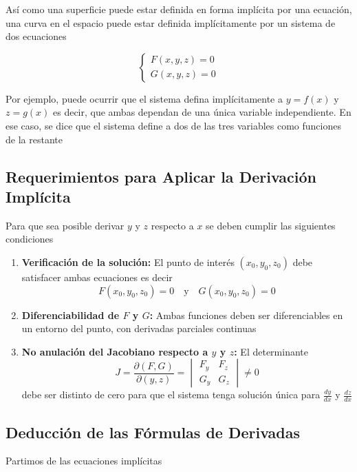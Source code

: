 \documentclass{article}
\begin{document}
Así como una superficie puede estar definida en forma implícita por una ecuación, una curva en el espacio puede estar definida implícitamente por un sistema de dos ecuaciones

\[
\begin{cases}
F(x,y,z) = 0 \\
G(x,y,z) = 0
\end{cases}
\]

Por ejemplo, puede ocurrir que el sistema defina implícitamente a \( y = f(x) \) y \( z = g(x) \) es decir, que ambas dependan de una única variable independiente. En ese caso, se dice que el sistema define a dos de las tres variables como funciones de la restante

\subsection*{Requerimientos para Aplicar la Derivación Implícita}
Para que sea posible derivar \( y \) y \( z \) respecto a \( x \) se deben cumplir las siguientes condiciones

\begin{enumerate}
    \item \textbf{\color{teal}Verificación de la solución:} El punto de interés \( (x_0, y_0, z_0) \) debe satisfacer ambas ecuaciones es decir
    \[
    F(x_0, y_0, z_0) = 0 \quad \text{y} \quad G(x_0, y_0, z_0) = 0
    \]
    \item \textbf{\color{teal}Diferenciabilidad de \( F \) y \( G \):} Ambas funciones deben ser diferenciables en un entorno del punto, con derivadas parciales continuas
    \item \textbf{\color{teal}No anulación del Jacobiano respecto a \( y \) y \( z \):} El determinante
    \[
    J = \frac{\partial(F,G)}{\partial(y,z)} = 
    \begin{vmatrix}
    F_y & F_z \\
    G_y & G_z
    \end{vmatrix}
    \neq 0
    \]
    debe ser distinto de cero para que el sistema tenga solución única para \( \frac{dy}{dx} \) y \( \frac{dz}{dx} \)
\end{enumerate}

\subsection*{Deducción de las Fórmulas de Derivadas}

Partimos de las ecuaciones implícitas
\end{document}
